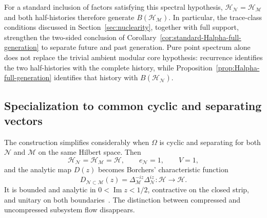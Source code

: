 \documentclass[a4paper,11pt]{article}
\theoremstyle{definition}
\newcommand{\mN}{\mathcal{N}}
\newcommand{\mH}{\mathcal{H}}
\newcommand{\mM}{\mathcal{M}}
\begin{document}
For a standard inclusion of factors satisfying this spectral hypothesis,
$\mH_{\mN}=\mH_{\mM}$ and both half-histories therefore generate
$B(\mH_{\mM})$. In particular, the trace-class conditions discussed in
Section~\ref{sec:nuclearity}, together with full support, strengthen the
two-sided conclusion of Corollary~\ref{cor:standard-Halpha-full-generation}
to separate future and past generation. Pure point spectrum alone
does not replace the trivial ambient modular core hypothesis: recurrence
identifies the two half-histories with the complete history, while
Proposition~\ref{prop:Halpha-full-generation} identifies that history
with $B(\mH_{\mN})$.

\subsection{Specialization to common cyclic and separating vectors}
\label{subsec:probing-common-cyclic}

The construction simplifies considerably when $\Omega$ is cyclic and
separating for both $\mN$ and $\mM$ on the same Hilbert space.
Then
\begin{equation}
    \mH_{\mN}=\mH_{\mM}=\mathcal H,
    \qquad
    e_{\mN}=1,
    \qquad
    V=1,
\end{equation}
and the analytic map $D(z)$ becomes Borchers' characteristic function
\begin{equation}
    \boxed{
    D_{\mN\subset\mM}(z)
    =
    \Delta_{\mM}^{-iz}\Delta_{\mN}^{iz}
    :
    \mathcal H\to\mathcal H .
    }
    \label{eq:D-common-probing}
\end{equation}
It is bounded and analytic in
$0<\operatorname{Im}z<1/2$, contractive on the closed strip, and unitary on
both boundaries~\cite{revolutionizing}. The distinction between compressed
and uncompressed subsystem flow disappears.
\end{document}
